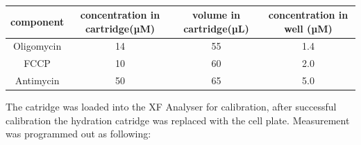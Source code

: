     \begin{table}[h]
    \capstart
    \centering
    \begin{minipage}{\captionwidth}
        \caption[toxins for seahorse]{}
        \label{tab:seahorse_toxins}
    \end{minipage}
    \begin{tabular}{|c|c|c|c|}
        \hline
        component  & concentration in cartridge(µM) & volume in cartridge(µL) & concentration in well (µM) \\ \hline
        Oligomycin & 14                             & 55                      & 1.4                        \\
        FCCP       & 10                             & 60                      & 2.0                        \\
        Antimycin  & 50                             & 65                      & 5.0                        \\ \hline
    \end{tabular}
    \end{table}

    The catridge was loaded into the XF Analyser for calibration, after successful calibration the hydration catridge was replaced with the cell plate. Measurement was programmed out as following:

